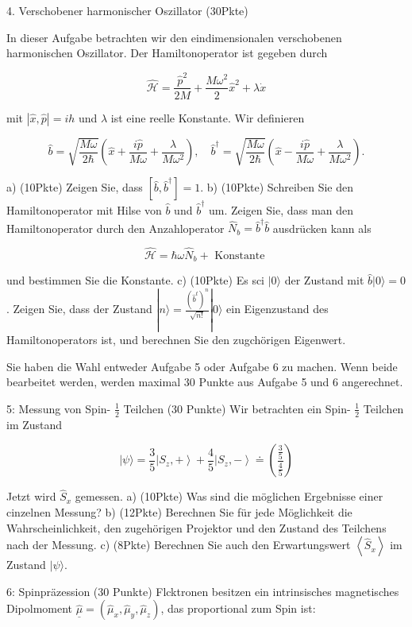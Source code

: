 \documentclass[11pt,a4paper]{article}
\begin{document}
4. Verschobener harmonischer Oszillator (30Pkte)

In dieser Aufgabe betrachten wir den eindimensionalen verschobenen harmonischen Oszillator. Der Hamiltonoperator ist gegeben durch

$$
\hat{\mathcal{H}}=\frac{\hat{p}^2}{2 M}+\frac{M \omega^2}{2} \hat{x}^2+\lambda \dot{x}
$$

mit $|\hat{x}, \hat{p}|=i h$ und $\lambda$ ist eine reelle Konstante. Wir definieren

$$
\hat{b}=\sqrt{\frac{M \omega}{2 \hbar}}\left(\hat{x}+\frac{i \hat{p}}{M \omega}+\frac{\lambda}{M \omega^2}\right), \quad \hat{b}^{\dagger}=\sqrt{\frac{M \omega}{2 \hbar}}\left(\hat{x}-\frac{i \hat{p}}{M \omega}+\frac{\lambda}{M \omega^2}\right) .
$$

a) (10Pkte) Zeigen Sie, dass $\left[\hat{b}, \hat{b}^{\dagger}\right]=1$.
b) (10Pkte) Schreiben Sie den Hamiltonoperator mit Hilse von $\hat{b}$ und $\hat{b}^{\dagger}$ um. Zeigen Sie, dass man den Hamiltonoperator durch den Anzahloperator $\hat{N}_b=\hat{b}^{\dagger} \hat{b}$ ausdrücken kann als

$$
\hat{\mathcal{H}}=\hbar \omega \hat{N}_b+\text { Konstante }
$$

und bestimmen Sie die Konstante.
c) (10Pkte) Es sci $|0\rangle$ der Zustand mit $\hat{b}|0\rangle=0$. Zeigen Sie, dass der Zustand $|n\rangle=\frac{\left(\hat{b}^t\right)^n}{\sqrt{n!}}|0\rangle$ ein Eigenzustand des Hamiltonoperators ist, und berechnen Sie den zugchörigen Eigenwert.


Sie haben die Wahl entweder Aufgabe 5 oder Aufgabe 6 zu machen. Wenn beide bearbeitet werden, werden maximal 30 Punkte aus Aufgabe 5 und 6 angerechnet.

5: Messung von Spin- $\frac{1}{2}$ Teilchen (30 Punkte)
Wir betrachten ein Spin- $\frac{1}{2}$ Teilchen im Zustand

$$
|\psi\rangle=\frac{3}{5}\left|S_z,+\right\rangle+\frac{4}{5}\left|S_z,-\right\rangle \doteq\left(\frac{\frac{3}{5}}{\frac{4}{5}}\right)
$$


Jetzt wird $\hat{S}_x$ gemessen.
a) (10Pkte) Was sind die möglichen Ergebnisse einer cinzelnen Messung?
b) (12Pkte) Berechnen Sie für jede Möglichkeit die Wahrscheinlichkeit, den zugehörigen Projektor und den Zustand des Teilchens nach der Messung.
c) (8Pkte) Berechnen Sie auch den Erwartungswert $\left\langle\hat{S}_x\right\rangle$ im Zustand $|\psi\rangle$.

6: Spinpräzession (30 Punkte)
Flcktronen besitzen ein intrinsisches magnetisches Dipolmoment $\underline{\hat{\mu}}=\left(\hat{\mu}_x, \hat{\mu}_y, \hat{\mu}_z\right)$, das proportional zum Spin ist:
\end{document}
